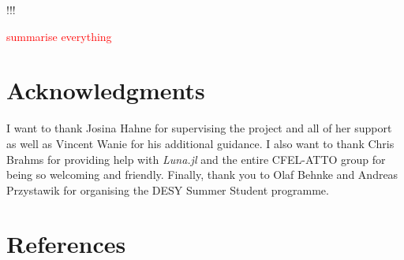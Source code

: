 \documentclass[a4paper]{jpconf}
\begin{document}
!!!

\textcolor{red}{summarise everything}


\section*{Acknowledgments}
I want to thank Josina Hahne for supervising the project and all of her support as well as Vincent Wanie for his additional guidance. I also want to thank Chris Brahms for providing help with \textit{Luna.jl} and the entire CFEL-ATTO group for being so welcoming and friendly. Finally, thank you to Olaf Behnke and Andreas Przystawik for organising the DESY Summer Student programme. 

\section*{References}


\end{document}
